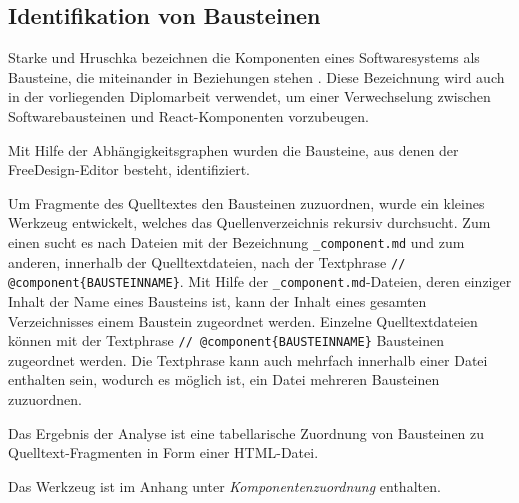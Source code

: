 

\subsection{Identifikation von Bausteinen}
Starke und Hruschka bezeichnen die Komponenten eines Softwaresystems als Bausteine, die miteinander in Beziehungen stehen \autocite[vgl.][24]{Starke2011}. Diese Bezeichnung wird auch in der vorliegenden Diplomarbeit verwendet, um einer Verwechselung zwischen Softwarebausteinen und React-Komponenten vorzubeugen.

Mit Hilfe der Abhängigkeitsgraphen wurden die Bausteine, aus denen der FreeDesign-Editor besteht, identifiziert. 

Um Fragmente des Quelltextes den Bausteinen zuzuordnen, wurde ein kleines Werkzeug entwickelt, welches das Quellenverzeichnis rekursiv durchsucht. Zum einen sucht es nach Dateien mit der Bezeichnung \glqq\lstinline|_component.md|\grqq{} und zum anderen, innerhalb der Quelltextdateien, nach der Textphrase \glqq\lstinline|// @component{BAUSTEINNAME}|\grqq{}. 
Mit Hilfe der \lstinline|_component.md|-Dateien, deren einziger Inhalt der Name eines Bausteins ist, kann der Inhalt eines gesamten Verzeichnisses einem Baustein zugeordnet werden. Einzelne Quelltextdateien können mit der Textphrase \glqq\lstinline|// @component{BAUSTEINNAME}|\grqq{} Bausteinen zugeordnet werden. Die Textphrase kann auch mehrfach innerhalb einer Datei enthalten sein, wodurch es möglich ist, ein Datei mehreren Bausteinen zuzuordnen. 

Das Ergebnis der Analyse ist eine tabellarische Zuordnung von Bausteinen zu Quelltext-Fragmenten in Form einer HTML-Datei. 

Das Werkzeug ist im Anhang unter \emph{Komponentenzuordnung} enthalten.



